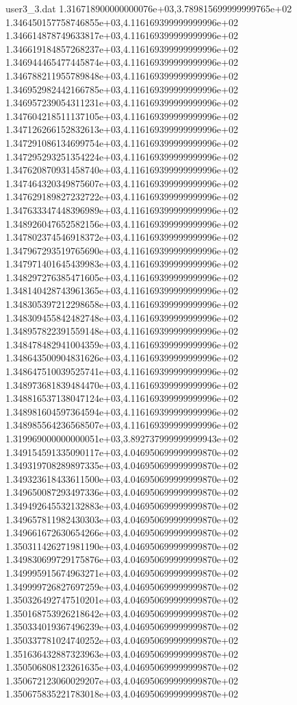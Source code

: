 \begin{filecontents}{user3_3.dat}
1.316718900000000076e+03,3.789815699999999765e+02
1.346450157758746855e+03,4.116169399999999996e+02
1.346614878749633817e+03,4.116169399999999996e+02
1.346619184857268237e+03,4.116169399999999996e+02
1.346944465477445874e+03,4.116169399999999996e+02
1.346788211955789848e+03,4.116169399999999996e+02
1.346952982442166785e+03,4.116169399999999996e+02
1.346957239054311231e+03,4.116169399999999996e+02
1.347604218511137105e+03,4.116169399999999996e+02
1.347126266152832613e+03,4.116169399999999996e+02
1.347291086134699754e+03,4.116169399999999996e+02
1.347295293251354224e+03,4.116169399999999996e+02
1.347620870931458740e+03,4.116169399999999996e+02
1.347464320349875607e+03,4.116169399999999996e+02
1.347629189827232722e+03,4.116169399999999996e+02
1.347633347448396989e+03,4.116169399999999996e+02
1.348926047652582156e+03,4.116169399999999996e+02
1.347802374546918372e+03,4.116169399999999996e+02
1.347967293519765690e+03,4.116169399999999996e+02
1.347971401645439983e+03,4.116169399999999996e+02
1.348297276385471605e+03,4.116169399999999996e+02
1.348140428743961365e+03,4.116169399999999996e+02
1.348305397212298658e+03,4.116169399999999996e+02
1.348309455842482748e+03,4.116169399999999996e+02
1.348957822391559148e+03,4.116169399999999996e+02
1.348478482941004359e+03,4.116169399999999996e+02
1.348643500904831626e+03,4.116169399999999996e+02
1.348647510039525741e+03,4.116169399999999996e+02
1.348973681839484470e+03,4.116169399999999996e+02
1.348816537138047124e+03,4.116169399999999996e+02
1.348981604597364594e+03,4.116169399999999996e+02
1.348985564236568507e+03,4.116169399999999996e+02
1.319969000000000051e+03,3.892737999999999943e+02
1.349154591335090117e+03,4.046950699999999870e+02
1.349319708289897335e+03,4.046950699999999870e+02
1.349323618433611500e+03,4.046950699999999870e+02
1.349650087293497336e+03,4.046950699999999870e+02
1.349492645532132883e+03,4.046950699999999870e+02
1.349657811982430303e+03,4.046950699999999870e+02
1.349661672630654266e+03,4.046950699999999870e+02
1.350311426271981190e+03,4.046950699999999870e+02
1.349830699729175876e+03,4.046950699999999870e+02
1.349995915674963271e+03,4.046950699999999870e+02
1.349999726827697259e+03,4.046950699999999870e+02
1.350326492747510201e+03,4.046950699999999870e+02
1.350168753926218642e+03,4.046950699999999870e+02
1.350334019367496239e+03,4.046950699999999870e+02
1.350337781024740252e+03,4.046950699999999870e+02
1.351636432887323963e+03,4.046950699999999870e+02
1.350506808123261635e+03,4.046950699999999870e+02
1.350672123060029207e+03,4.046950699999999870e+02
1.350675835221783018e+03,4.046950699999999870e+02

\end{filecontents}
